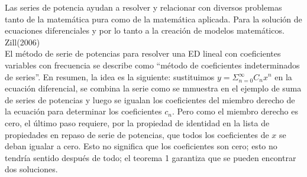 \documentclass[12pt,letterpaper,oneside]{article}
\begin{document}
 Las series de potencia ayudan a resolver y relacionar con diversos problemas tanto de la matemática pura como de la matemática aplicada. Para la solución de ecuaciones diferenciales y por lo tanto a la creación de modelos matemáticos. Zill(2006)\vspace{1.0cm}\\
El método de serie de potencias para resolver una ED lineal con coeficientes variables con frecuencia se describe como “método de coeficientes indeterminados de series”. En resumen, la idea es la siguiente: sustituimos $y = \Sigma{^\infty_{n=0}}C_nx^n$ en la ecuación diferencial, se combina la serie como se mmuestra en el ejemplo de suma de series de potencias  y luego se igualan los coeficientes del miembro derecho de la ecuación para determinar los coeficientes $c_n$. Pero como el miembro derecho es cero, el último paso requiere, por la propiedad de identidad en la lista de propiedades en repaso de serie de potencias, que todos los coeficientes de $x$ se deban igualar a cero. Esto no
significa que los coeficientes son cero; esto no tendría sentido después de todo; el teorema 1 garantiza que se pueden encontrar dos soluciones.
\end{document}
